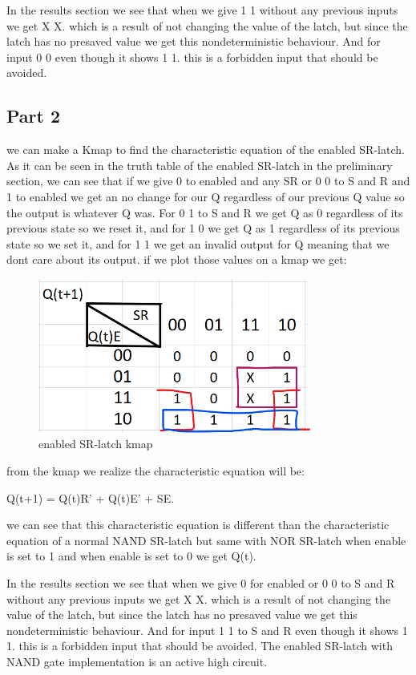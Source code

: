 \documentclass[pdftex,12pt,a4paper]{article}
\begin{document}
In the results section we see that when we give 1 1 without any previous inputs we get X X. which is a result of not changing the value of the latch, but since the latch has no presaved value we get this nondeterministic behaviour. And for input 0 0 even though it shows 1 1. this is a forbidden input that should be avoided.
\subsection{Part 2}
we can make a Kmap to find the characteristic equation of the enabled SR-latch. As it can be seen in the truth table of the enabled SR-latch in the preliminary section, we can see that if we give 0 to enabled and any SR or 0 0 to S and R and 1 to enabled we get an no change for our Q regardless of our previous Q value so the output is whatever Q was. For 0 1 to S and R we get Q as 0 regardless of its previous state so we reset it, and for 1 0 we get Q as 1 regardless of its previous state so we set it, and for 1 1 we get an invalid output for Q meaning that we dont care about its output. if we plot those values on a kmap we get:
    \begin{figure}[H]
    	\centering
    	\includegraphics[width=0.8\textwidth]{kmap/enabled_sr.png}	
    	\caption{enabled SR-latch kmap}
    	\label{enabled SR-latch kmap}
    \end{figure}
from the kmap we realize the characteristic equation will be:

Q(t+1) = Q(t)R' + Q(t)E' + SE. 

we can see that this characteristic equation is different than the characteristic equation of a normal NAND SR-latch but same with NOR SR-latch when enable is set to 1 and when enable is set to 0 we get Q(t).

In the results section we see that when we give 0 for enabled or 0 0 to S and R without any previous inputs we get X X. which is a result of not changing the value of the latch, but since the latch has no presaved value we get this nondeterministic behaviour. And for input 1 1 to S and R even though it shows 1 1. this is a forbidden input that should be avoided.
The enabled SR-latch with NAND gate implementation is an active high circuit.
\end{document}
